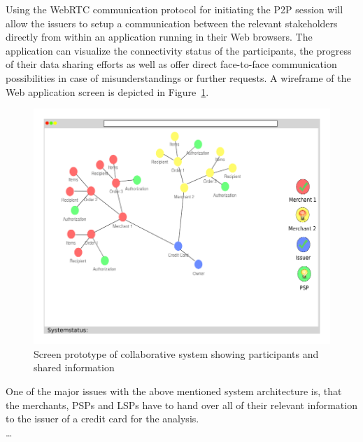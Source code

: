 Using the \gls{WebRTC} communication protocol for initiating the \gls{P2P} session will allow the issuers to setup a communication between the relevant stakeholders directly from within an application running in their Web browsers. The application can visualize the connectivity status of the participants, the progress of their data sharing efforts as well as offer direct face-to-face communication possibilities in case of misunderstandings or further requests. A wireframe of the Web application screen is depicted in Figure~\ref{fig:images_p2p_initial_screen}. \@

\begin{figure}[H]
	\centering
		\includegraphics[width=0.9\columnwidth]{images/p2p_initial_screen.pdf}
	\caption{Screen prototype of collaborative system showing participants and shared information}
\label{fig:images_p2p_initial_screen}
\end{figure}

One of the major issues with the above mentioned system architecture is, that the merchants, \gls{PSP}s and \gls{LSP}s have to hand over all of their relevant information to the issuer of a credit card for the analysis. \\

\ldots


